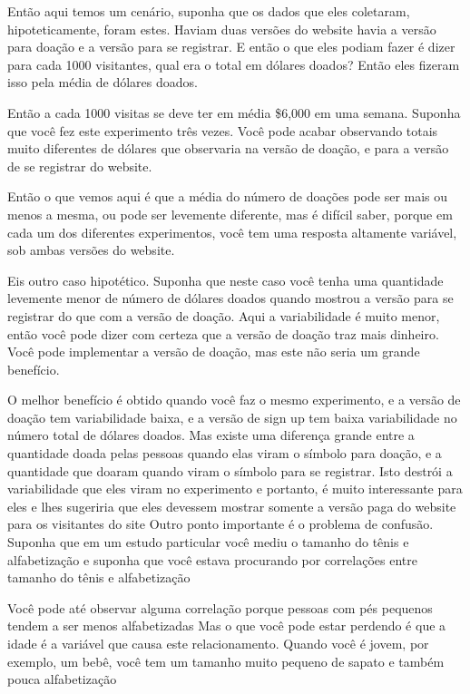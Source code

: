 \begin{multicols}{2}
\begin{footnotesize}
Então aqui temos um cenário, suponha que os dados que eles coletaram, hipoteticamente, foram estes. Haviam duas versões do website havia a versão para doação e a versão para se registrar. E então o que eles podiam fazer é dizer para cada 1000 visitantes, qual era o total em dólares doados? Então eles fizeram isso pela média de dólares doados. 

Então a cada 1000 visitas se deve ter em média \$6,000 em uma semana. Suponha que você fez este experimento três vezes. Você pode acabar observando totais muito diferentes de dólares que observaria na versão de doação, e para a versão de se registrar do website. 

Então o que vemos aqui é que a média do número de doações pode ser mais ou menos a mesma, ou pode ser levemente diferente, mas é difícil saber, porque em cada um dos diferentes experimentos, você tem uma resposta altamente variável, sob ambas versões do website. 

Eis outro caso hipotético. Suponha que neste caso você tenha uma quantidade levemente menor de número de dólares doados quando mostrou a versão para se registrar do que com a versão de doação. Aqui a variabilidade é muito menor, então você pode dizer com certeza que a versão de doação traz mais dinheiro. Você pode implementar a versão de doação, mas este não seria um grande benefício. 

O melhor benefício é obtido quando você faz o mesmo experimento, e a versão de doação tem variabilidade baixa, e a versão de sign up tem baixa variabilidade no número total de dólares doados. Mas existe uma diferença grande entre a quantidade doada pelas pessoas quando elas viram o símbolo para doação, e a quantidade que doaram quando viram o símbolo para se registrar. Isto destrói a variabilidade que eles viram no experimento e portanto, é muito interessante para eles e lhes sugeriria que eles devessem mostrar somente a versão paga do website para os visitantes do site Outro ponto importante é o problema de confusão. Suponha que em um estudo particular você mediu o tamanho do tênis e alfabetização e suponha que você estava procurando por correlações entre tamanho do tênis e alfabetização 

Você pode até observar alguma correlação porque pessoas com pés pequenos tendem a ser menos alfabetizadas Mas o que você pode estar perdendo é que a idade é a variável que causa este relacionamento. Quando você é jovem, por exemplo, um bebê, você tem um tamanho muito pequeno de sapato e também pouca alfabetização 


\end{footnotesize}
\end{multicols}
